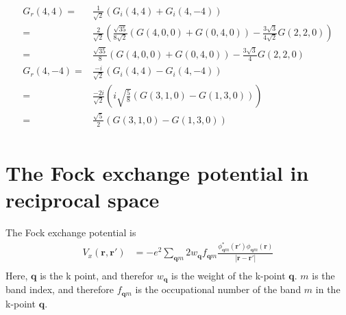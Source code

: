 \documentclass[a4paper,12pt]{article}
\begin{document}
\begin{equation}
	\begin{split}
		G_r(4,4) = &\frac{1}{\sqrt{2}}\left(G_i(4,4)+G_i(4,-4)\right)\\
		         =&\frac{2}{\sqrt{2}}\left(\frac{\sqrt{35}}{8\sqrt{2}}(G(4,0,0)+G(0,4,0))-\frac{3\sqrt{3}}{4\sqrt{2}}G(2,2,0)\right)\\
				 =&\frac{\sqrt{35}}{8}(G(4,0,0)+G(0,4,0))-\frac{3\sqrt{3}}{4}G(2,2,0)\\
		G_r(4,-4) = &\frac{-i}{\sqrt{2}}\left(G_i(4,4)-G_i(4,-4)\right)\\
		          = &\frac{-2i}{\sqrt{2}}\left(i\sqrt{\frac{5}{8}}(G(3,1,0)-G(1,3,0))\right)\\
				  = &\frac{\sqrt{5}}{2}(G(3,1,0)-G(1,3,0))\\
	\end{split}
\end{equation}





\newpage


\section{The Fock exchange potential in reciprocal space}
The Fock exchange potential is
\begin{equation}
    \begin{split}
        V_{x}(\boldsymbol{r},\boldsymbol{r}')&=
        -e^2\sum_{\boldsymbol{q}m}2w_{\boldsymbol{q}}f_{\boldsymbol{q}m}
        \frac{\phi_{\boldsymbol{q}m}^{*}(\boldsymbol{r}')\phi_{\boldsymbol{q}m}(\boldsymbol{r})}{|\boldsymbol{r}-\boldsymbol{r}'|}\\
    \end{split}
\end{equation}
Here, $\boldsymbol{q}$ is the k point, and therefor $w_{\boldsymbol{q}}$ is the weight of the k-point $\boldsymbol{q}$. $m$ is the band index, and
therefore $f_{\boldsymbol{q}m}$ is the occupational number of the band $m$ in the k-point $\boldsymbol{q}$.
\end{document}
